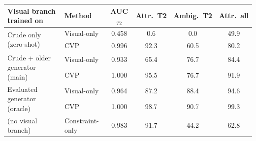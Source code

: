 \begin{tabular}{llcccc}
\toprule
Visual branch trained on & Method & AUC$_{T2}$ & Attr.\ T2 & Ambig.\ T2 & Attr.\ all\\
\midrule
\multirow{2}{*}{Crude only (zero-shot)} & Visual-only & 0.458 & 0.6 & 0.0 & 49.9\\
 & CVP & 0.996 & 92.3 & 60.5 & 80.2\\
\midrule
\multirow{2}{*}{Crude + older generator (main)} & Visual-only & 0.933 & 65.4 & 76.7 & 84.4\\
 & CVP & 1.000 & 95.5 & 76.7 & 91.9\\
\midrule
\multirow{2}{*}{Evaluated generator (oracle)} & Visual-only & 0.964 & 87.2 & 88.4 & 94.6\\
 & CVP & 1.000 & 98.7 & 90.7 & 99.3\\
\midrule
(no visual branch) & Constraint-only & 0.983 & 91.7 & 44.2 & 62.8\\
\bottomrule
\end{tabular}
